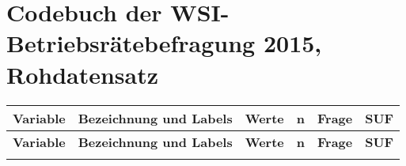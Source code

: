 
\section{Codebuch der WSI-Betriebsrätebefragung 2015, Rohdatensatz}\label{kap_rohdaten}

\begin{longtable}{| L{2.45cm} | L{6cm} | C{1.5cm} | R{1cm} | C{2.25cm} | C{2.25cm} |}

\toprule
\textbf{Variable} & \textbf{Bezeichnung und Labels} & \textbf{Werte} &  \textbf{n} & \textbf{Frage} & \textbf{SUF} \\ 
\midrule
\endfirsthead
\toprule
\textbf{Variable} & \textbf{Bezeichnung und Labels} & \textbf{Werte} & \textbf{n} & \textbf{Frage} & \textbf{SUF} \\ 
\midrule
\endhead

\midrule

\endfoot
\bottomrule
\endlastfoot



\end{longtable}
